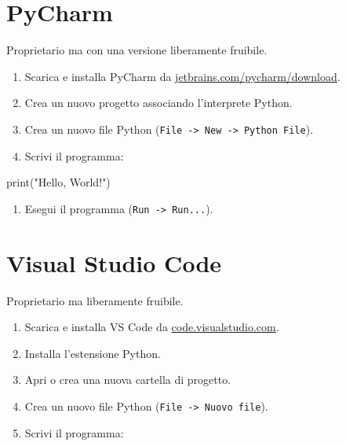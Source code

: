 \documentclass[
  letterpaper,
  DIV=11,
  numbers=noendperiod]{scrreprt}
\newenvironment{Shaded}{\begin{snugshade}}{\end{snugshade}}
\newcommand{\BuiltInTok}[1]{\textcolor[rgb]{0.00,0.23,0.31}{#1}}
\newcommand{\NormalTok}[1]{\textcolor[rgb]{0.00,0.23,0.31}{#1}}
\newcommand{\StringTok}[1]{\textcolor[rgb]{0.13,0.47,0.30}{#1}}
\providecommand{\tightlist}{%
  \setlength{\itemsep}{0pt}\setlength{\parskip}{0pt}}\usepackage{longtable,booktabs,array}
\begin{document}
\section{PyCharm}

Proprietario ma con una versione liberamente fruibile.

\begin{enumerate}
\def\labelenumi{\arabic{enumi}.}
\tightlist
\item
  Scarica e installa PyCharm da
  \href{https://www.jetbrains.com/pycharm/download/}{jetbrains.com/pycharm/download}.
\item
  Crea un nuovo progetto associando l'interprete Python.
\item
  Crea un nuovo file Python
  (\texttt{File\ -\textgreater{}\ New\ -\textgreater{}\ Python\ File}).
\item
  Scrivi il programma:
\end{enumerate}

\begin{Shaded}
\begin{Highlighting}[]
\BuiltInTok{print}\NormalTok{(}\StringTok{"Hello, World!"}\NormalTok{)}
\end{Highlighting}
\end{Shaded}

\begin{enumerate}
\def\labelenumi{\arabic{enumi}.}
\setcounter{enumi}{4}
\tightlist
\item
  Esegui il programma (\texttt{Run\ -\textgreater{}\ Run...}).
\end{enumerate}

\section{Visual Studio Code}

Proprietario ma liberamente fruibile.

\begin{enumerate}
\def\labelenumi{\arabic{enumi}.}
\tightlist
\item
  Scarica e installa VS Code da
  \href{https://code.visualstudio.com/}{code.visualstudio.com}.
\item
  Installa l'estensione Python.
\item
  Apri o crea una nuova cartella di progetto.
\item
  Crea un nuovo file Python
  (\texttt{File\ -\textgreater{}\ Nuovo\ file}).
\item
  Scrivi il programma:
\end{enumerate}
\end{document}
